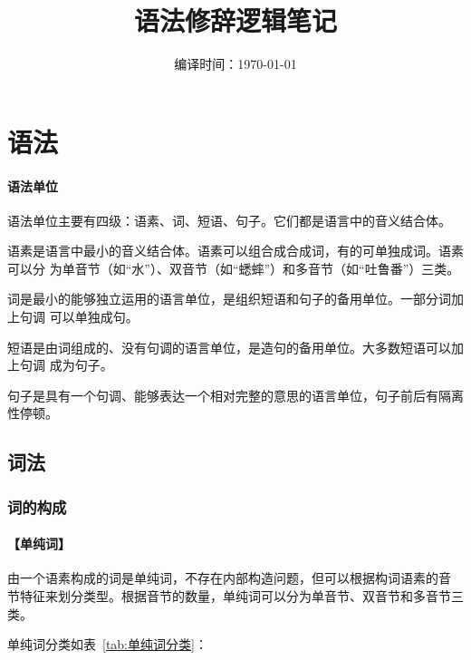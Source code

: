 \documentclass[final,oneside]{ctexbook}
\title{语法修辞逻辑笔记}
\author{}
\date{编译时间：\today}
\begin{document}
\maketitle

\frontmatter

% 
\tableofcontents
\listoftables

\mainmatter

\chapter{语法}

\subsubsection{语法单位}

语法单位主要有四级：语素、词、短语、句子。它们都是语言中的音义结合体。

语素是语言中最小的音义结合体。语素可以组合成合成词，有的可单独成词。语素可以分
为单音节（如“水”）、双音节（如“蟋蟀”）和多音节（如“吐鲁番”）三类。

词是最小的能够独立运用的语言单位，是组织短语和句子的备用单位。一部分词加上句调
可以单独成句。

短语是由词组成的、没有句调的语言单位，是造句的备用单位。大多数短语可以加上句调
成为句子。

句子是具有一个句调、能够表达一个相对完整的意思的语言单位，句子前后有隔离性停顿。

\section{词法}

\subsection{词的构成}

\subsubsection{【单纯词】}

由一个语素构成的词是单纯词，不存在内部构造问题，但可以根据构词语素的音
节特征来划分类型。根据音节的数量，单纯词可以分为单音节、双音节和多音节三类。

单纯词分类如表~\ref{tab:单纯词分类}：
\end{document}
